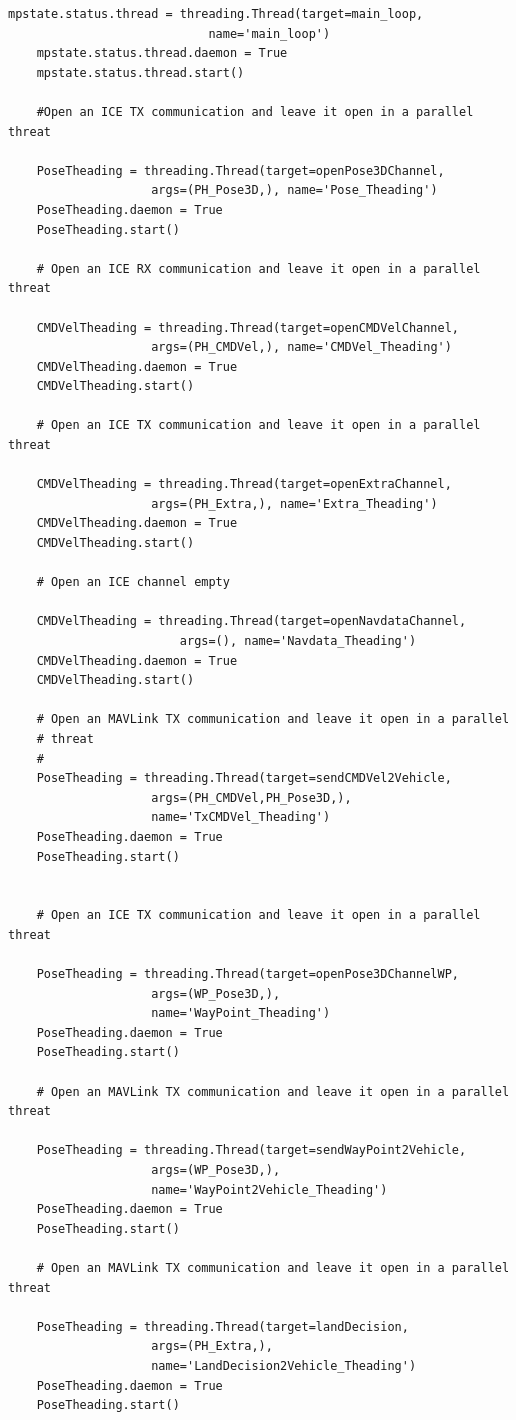 \begin{lstlisting}[frame=single]
	mpstate.status.thread = threading.Thread(target=main_loop, 
    						name='main_loop')
    mpstate.status.thread.daemon = True
    mpstate.status.thread.start()

    #Open an ICE TX communication and leave it open in a parallel threat

    PoseTheading = threading.Thread(target=openPose3DChannel, 
    				args=(PH_Pose3D,), name='Pose_Theading')
    PoseTheading.daemon = True
    PoseTheading.start()

    # Open an ICE RX communication and leave it open in a parallel threat

    CMDVelTheading = threading.Thread(target=openCMDVelChannel, 
    				args=(PH_CMDVel,), name='CMDVel_Theading')
    CMDVelTheading.daemon = True
    CMDVelTheading.start()

    # Open an ICE TX communication and leave it open in a parallel threat

    CMDVelTheading = threading.Thread(target=openExtraChannel, 
    				args=(PH_Extra,), name='Extra_Theading')
    CMDVelTheading.daemon = True
    CMDVelTheading.start()

    # Open an ICE channel empty

    CMDVelTheading = threading.Thread(target=openNavdataChannel, 
    					args=(), name='Navdata_Theading')
    CMDVelTheading.daemon = True
    CMDVelTheading.start()

    # Open an MAVLink TX communication and leave it open in a parallel 
    # threat
    #
    PoseTheading = threading.Thread(target=sendCMDVel2Vehicle, 
    				args=(PH_CMDVel,PH_Pose3D,), 
                    name='TxCMDVel_Theading')
    PoseTheading.daemon = True
    PoseTheading.start()


    # Open an ICE TX communication and leave it open in a parallel threat

    PoseTheading = threading.Thread(target=openPose3DChannelWP, 
    				args=(WP_Pose3D,), 
                    name='WayPoint_Theading')
    PoseTheading.daemon = True
    PoseTheading.start()

    # Open an MAVLink TX communication and leave it open in a parallel threat

    PoseTheading = threading.Thread(target=sendWayPoint2Vehicle,
    				args=(WP_Pose3D,), 
                    name='WayPoint2Vehicle_Theading')
    PoseTheading.daemon = True
    PoseTheading.start()

    # Open an MAVLink TX communication and leave it open in a parallel threat

    PoseTheading = threading.Thread(target=landDecision, 
    				args=(PH_Extra,), 
                    name='LandDecision2Vehicle_Theading')
    PoseTheading.daemon = True
    PoseTheading.start()
   
\end{lstlisting}

